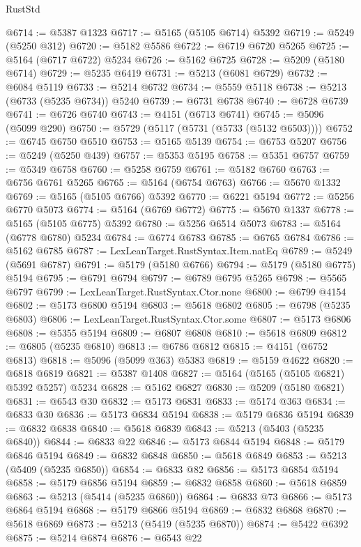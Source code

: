 \begin{lexlean}{RustStd}
\begin{coremodule}
@6714 := @5387 @1323
@6717 := @5165 (@5105 @6714) @5392
@6719 := @5249 (@5250 @312)
@6720 := @5182 @5586
@6722 := @6719 @6720 @5265
@6725 := @5164 (@6717 @6722) @5234
@6726 := @5162 @6725
@6728 := @5209 (@5180 @6714)
@6729 := @5235 @6419
@6731 := @5213 (@6081 @6729)
@6732 := @6084 @5119
@6733 := @5214 @6732
@6734 := @5559 @5118
@6738 := @5213 (@6733 (@5235 @6734)) @5240
@6739 := @6731 @6738
@6740 := @6728 @6739
@6741 := @6726 @6740
@6743 := @4151 (@6713 @6741)
@6745 := @5096 (@5099 @290)
@6750 := @5729 (@5117 (@5731 (@5733 (@5132 @6503))))
@6752 := @6745 @6750 @6510
@6753 := @5165 @5139
@6754 := @6753 @5207
@6756 := @5249 (@5250 @439)
@6757 := @5353 @5195
@6758 := @5351 @6757
@6759 := @5349 @6758
@6760 := @5258 @6759
@6761 := @5182 @6760
@6763 := @6756 @6761 @5265
@6765 := @5164 (@6754 @6763)
@6766 := @5670 @1332
@6769 := @5165 (@5105 @6766) @5392
@6770 := @6221 @5194
@6772 := @5256 @6770 @5073
@6774 := @5164 (@6769 @6772)
@6775 := @5670 @1337
@6778 := @5165 (@5105 @6775) @5392
@6780 := @5256 @6514 @5073
@6783 := @5164 (@6778 @6780) @5234
@6784 := @6774 @6783
@6785 := @6765 @6784
@6786 := @5162 @6785
@6787 := LexLeanTarget.RustSyntax.Item.natEq
@6789 := @5249 (@5691 @6787)
@6791 := @5179 (@5180 @6766)
@6794 := @5179 (@5180 @6775) @5194
@6795 := @6791 @6794
@6797 := @6789 @6795 @5265
@6798 := @5565 @6797
@6799 := LexLeanTarget.RustSyntax.Ctor.none
@6800 := @6799 @4154
@6802 := @5173 @6800 @5194
@6803 := @5618 @6802
@6805 := @6798 (@5235 @6803)
@6806 := LexLeanTarget.RustSyntax.Ctor.some
@6807 := @5173 @6806
@6808 := @5355 @5194
@6809 := @6807 @6808
@6810 := @5618 @6809
@6812 := @6805 (@5235 @6810)
@6813 := @6786 @6812
@6815 := @4151 (@6752 @6813)
@6818 := @5096 (@5099 @363) @5383
@6819 := @5159 @4622
@6820 := @6818 @6819
@6821 := @5387 @1408
@6827 := @5164 (@5165 (@5105 @6821) @5392 @5257) @5234
@6828 := @5162 @6827
@6830 := @5209 (@5180 @6821)
@6831 := @6543 @30
@6832 := @5173 @6831
@6833 := @5174 @363
@6834 := @6833 @30
@6836 := @5173 @6834 @5194
@6838 := @5179 @6836 @5194
@6839 := @6832 @6838
@6840 := @5618 @6839
@6843 := @5213 (@5403 (@5235 @6840))
@6844 := @6833 @22
@6846 := @5173 @6844 @5194
@6848 := @5179 @6846 @5194
@6849 := @6832 @6848
@6850 := @5618 @6849
@6853 := @5213 (@5409 (@5235 @6850))
@6854 := @6833 @82
@6856 := @5173 @6854 @5194
@6858 := @5179 @6856 @5194
@6859 := @6832 @6858
@6860 := @5618 @6859
@6863 := @5213 (@5414 (@5235 @6860))
@6864 := @6833 @73
@6866 := @5173 @6864 @5194
@6868 := @5179 @6866 @5194
@6869 := @6832 @6868
@6870 := @5618 @6869
@6873 := @5213 (@5419 (@5235 @6870))
@6874 := @5422 @6392
@6875 := @5214 @6874
@6876 := @6543 @22

\end{coremodule}
\end{lexlean}

